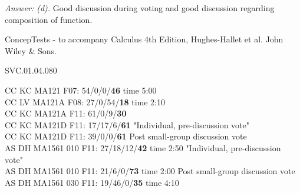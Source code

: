 {\it Answer: (d).} Good discussion during voting and good discussion regarding composition of function.

\medskip
ConcepTests - to accompany Calculus 4th Edition, Hughes-Hallet et al. John Wiley \& Sons.

SVC.01.04.080


CC KC MA121 F07: 54/0/0/{\bf46} time 5:00\\
CC LV MA121A F08: 27/0/54/{\bf18} time 2:10\\ 
CC KC MA121A F11: 61/0/9/{\bf30}  \\
CC KC MA121D F11: 17/17/6/{\bf61} "Individual, pre-discussion vote" \\
CC KC MA121D F11: 39/0/0/{\bf61} Post small-group discussion vote \\
AS DH MA1561 010 F11: 27/18/12/{\bf42} time 2:50 "Individual, pre-discussion vote" \\
AS DH MA1561 010 F11: 21/6/0/{\bf73} time 2:00 Post small-group discussion vote \\
AS DH MA1561 030 F11: 19/46/0/{\bf35} time 4:10  \\
